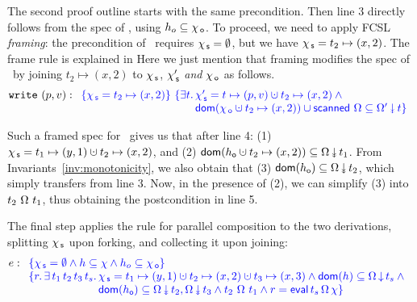 The second proof outline starts with the same precondition. Then line
$3$ directly follows from the spec of \jywrite, using $h_o
\subseteq \chi_{\, \mathsf{o}}$. To proceed, we need to apply FCSL
\emph{framing}: the precondition of \jywrite\ requires $\chi_{\, \mathsf{s}} =
\emptyset$, but we have $\chi_{\, \mathsf{s}} = t_2 \mapsto (x, 2)$.
The frame rule is explained in
%
%
\ifdefined{}
\fi
%
Here we just mention that framing modifies the spec of \jywrite\ by
joining $t_2 \mapsto (x, 2)$ to $\chi_{\, \mathsf{s}}$, $\chi_{\, \mathsf{s}}'$ \emph{and}
$\chi_{\, \mathsf{o}}$ as follows.  {\small
\[
\mathtt{write}\ (p, v) : 
\begin{array}[t]{l}
\tsPre{\{\histS = t_2 \mapsto (x, 2)\}}\
\tsPos{\{\exists t\ldot \histS' = t \mapsto (p, v) \hunion t_2 \mapsto (x, 2) \wedge \hbox{}}\\
\tsPos{\hphantom{\{\histS = t_2 \mapsto (x, 2)\}\ \{\exists t\ldot}
    \dom {\histO \hunion t_2 \mapsto (x, 2)} \cup \scanned\, \stableorder
       \subseteq \sideal{\stableorderP}{t}\}}
\end{array}
\]}

Such a framed spec for \jywrite\ gives us that after line 4: (1)
$\histS = t_1 \hpts (y,1) \hunion t_2 \hpts (x,2)$, and (2)
$\dom{h_{\othersub} \hunion t_2 \mapsto (x, 2)} \subseteq
\sideal{\stableorder}{t_1}$. From Invariants~\ref{inv:monotonicity},
we also obtain that (3) $\dom{h_{\othersub}} \subseteq
\sideal{\stableorder}{t_2}$, which simply transfers from line 3. Now,
in the presence of (2), we can simplify (3) into
$t_2\ {\Omega}\ t_1$, thus obtaining the postcondition in line
5.

The final step applies the rule for parallel composition to the two
derivations, splitting $\chi_{\, \mathsf{s}}$ upon forking, and collecting it upon
joining:
%
{\small
\[
e : \begin{array}[t]{l}
    \specK{\{\histS = \hempty \wedge h \subseteq \hist \wedge h_o \subseteq \histO\}}\\
 \specK{\{r\ldot \exists\, t_1\, t_2\, t_3\, t_s \ldot 
    \histS = t_1 \hpts (y,1) \hunion t_2 \hpts (x,2) \hunion t_3 \hpts
        (x, 3) \wedge  \dom{h} \subseteq \ideal{\stableorder}{t_s} \wedge \hbox{}}\\
\specK{\hphantom{\{r\ldot \exists\, t_1\, t_2\, t_3\, t_s \ldot }
\dom{h_{\othersub}} \subseteq \sideal{\stableorder}{t_2}, \sideal{\stableorder}{t_3} \wedge 
 t_2\ {\stableorder}\ t_1 \wedge 
     r = \eval\, t_s\, \stableorder\, \hist\}}
\end{array}
\]}


